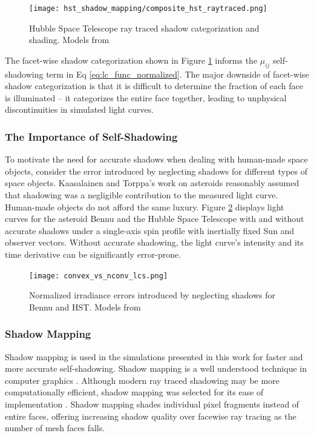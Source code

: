 \graphicspath{{/Users/liamrobinson/Documents/msthesis/static_images/aas_2022_figs}}
\begin{figure}[!htb]
  \centering
  \texttt{[image: hst\_shadow\_mapping/composite\_hst\_raytraced.png]}
  \caption{Hubble Space Telescope ray traced shadow categorization and shading. Models from \cite{nasa_models}}
  \label{fig:hst_shadows_ray}
\end{figure}

The facet-wise shadow categorization shown in Figure \ref{fig:hst_shadows_ray} informs the $\mu_{ij}$ self-shadowing term in Eq \ref{eq:lc_func_normalized}. The major downside of facet-wise shadow categorization is that it is difficult to determine the fraction of each face is illuminated -- it categorizes the entire face together, leading to unphysical discontinuities in simulated light curves.

\subsubsection{The Importance of Self-Shadowing}

To motivate the need for accurate shadows when dealing with human-made space objects, consider the error introduced by neglecting shadows for different types of space objects. Kaasalainen and Torppa's work on asteroids reasonably assumed that shadowing was a negligible contribution to the measured light curve. Human-made objects do not afford the same luxury. Figure \ref{fig:hst_bennu_shadows} displays light curves for the asteroid Bennu and the Hubble Space Telescope with and without accurate shadows under a single-axis spin profile with inertially fixed Sun and observer vectors. Without accurate shadowing, the light curve's intensity and its time derivative can be significantly error-prone.

\begin{figure}[!htb]
  \centering
  \texttt{[image: convex\_vs\_nconv\_lcs.png]}
  \caption{Normalized irradiance errors introduced by neglecting shadows for Bennu and HST. Models from \cite{nasa_models}}
  \label{fig:hst_bennu_shadows}
\end{figure}

\subsubsection{Shadow Mapping} \label{sec:shadow_mapping}

Shadow mapping is used in the simulations presented in this work for faster and more accurate self-shadowing. Shadow mapping is a well understood technique in computer graphics \cite{kolivand2013}. Although modern ray traced shadowing may be more computationally efficient, shadow mapping was selected for its ease of implementation \cite{kolivand2013}. Shadow mapping shades individual pixel fragments instead of entire faces, offering increasing shadow quality over facewise ray tracing as the number of mesh faces falls.

